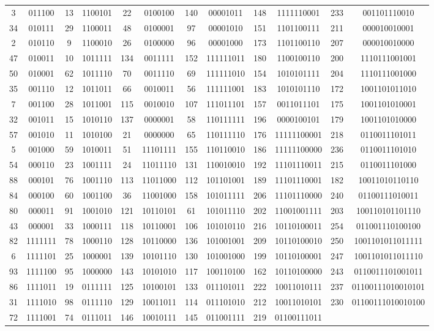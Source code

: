 \documentclass[conference,onecolumn,12pt]{IEEEtran}
\numberwithin{equation}{subsection}
\begin{document}
\begin{itemize}
\begin{table}[H]
\begin{tabular}{cccccccccccc}
3 & 011100 & 13 & 1100101 & 22 & 0100100 & 140 & 00001011 & 148 & 1111110001 & 233 & 001101110010 \\
34 & 010111 & 29 & 1100011 & 48 & 0100001 & 97 & 00001010 & 151 & 1101100111 & 211 & 000010010001 \\
2 & 010110 & 9 & 1100010 & 26 & 0100000 & 96 & 00001000 & 173 & 1101100110 & 207 & 000010010000 \\
47 & 010011 & 10 & 1011111 & 134 & 0011111 & 152 & 111111011 & 180 & 1100100110 & 200 & 1110111001001 \\
50 & 010001 & 62 & 1011110 & 70 & 0011110 & 69 & 111111010 & 154 & 1010101111 & 204 & 1110111001000 \\
35 & 001110 & 12 & 1011011 & 66 & 0010011 & 56 & 111111001 & 183 & 1010101110 & 172 & 1001101011010 \\
7 & 001100 & 28 & 1011001 & 115 & 0010010 & 107 & 111011101 & 157 & 0011011101 & 175 & 1001101010001 \\
32 & 001011 & 15 & 1010110 & 137 & 0000001 & 58 & 110111111 & 196 & 0000100101 & 179 & 1001101010000 \\
57 & 001010 & 11 & 1010100 & 21 & 0000000 & 65 & 110111110 & 176 & 11111100001 & 218 & 0110011101011 \\
5 & 001000 & 59 & 1010011 & 51 & 11101111 & 155 & 110110010 & 186 & 11111100000 & 236 & 0110011101010 \\
54 & 000110 & 23 & 1001111 & 24 & 11011110 & 131 & 110010010 & 192 & 11101110011 & 215 & 0110011101000 \\
88 & 000101 & 76 & 1001110 & 113 & 11011000 & 112 & 101101001 & 189 & 11101110001 & 182 & 10011010110110 \\
84 & 000100 & 60 & 1001100 & 36 & 11001000 & 158 & 101011111 & 206 & 11101110000 & 240 & 01100111010011 \\
80 & 000011 & 91 & 1001010 & 121 & 10110101 & 61 & 101011110 & 202 & 11001001111 & 203 & 100110101101110 \\
43 & 000001 & 33 & 1000111 & 118 & 10110001 & 106 & 101010110 & 216 & 10110100011 & 254 & 011001110100100 \\
82 & 1111111 & 78 & 1000110 & 128 & 10110000 & 136 & 101001001 & 209 & 10110100010 & 250 & 1001101011011111 \\
6 & 1111101 & 25 & 1000001 & 139 & 10101110 & 130 & 101001000 & 199 & 10110100001 & 247 & 1001101011011110 \\
93 & 1111100 & 95 & 1000000 & 143 & 10101010 & 117 & 100110100 & 162 & 10110100000 & 243 & 0110011101001011 \\
86 & 1111011 & 19 & 0111111 & 125 & 10100101 & 133 & 011101011 & 222 & 10011010111 & 237 & 01100111010010101 \\
31 & 1111010 & 98 & 0111110 & 129 & 10011011 & 114 & 011101010 & 212 & 10011010101 & 230 & 01100111010010100 \\
72 & 1111001 & 74 & 0111011 & 146 & 10010111 & 145 & 011001111 & 219 & 01100111011 \\
\bottomrule
\end{tabular}
\end{table}
    

\end{itemize}
\end{document}
